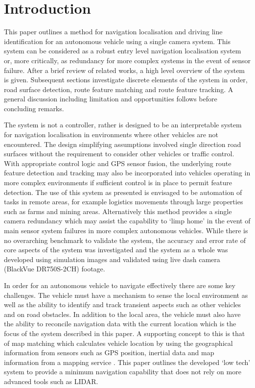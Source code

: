 \documentclass[]{aiaa-tc}%
\begin{document}

\newpage
\section{Introduction} \label{sect:intro}


This paper outlines a method for navigation localisation and driving line identification for an autonomous vehicle using a single camera system. This system can be considered as a robust entry level navigation localisation system or, more critically, as redundancy for more complex systems in the event of sensor failure. After a brief review of related works, a high level overview of the system is given. Subsequent sections investigate discrete elements of the system in order, road surface detection, route feature matching and route feature tracking. A general discussion including limitation and opportunities follows before concluding remarks.

The system is not a controller, rather is designed to be an interpretable system for navigation localisation in environments where other vehicles are not encountered. The design simplifying assumptions involved single direction road surfaces without the requirement to consider other vehicles or traffic control. With appropriate control logic and GPS sensor fusion, the underlying route feature detection and tracking may also be incorporated into vehicles operating in more complex environments if sufficient control is in place to permit feature detection. The use of this system as presented is envisaged to be automation of tasks in remote areas, for example logistics movements through large properties such as farms and mining areas. Alternatively this method provides a single camera redundancy which may assist the capability to `limp home' in the event of main sensor system failures in more complex autonomous vehicles. While there is no overarching benchmark to validate the system, the accuracy and error rate of core aspects of the system was investigated and the system as a whole was developed using simulation images and validated using live dash camera (BlackVue DR750S-2CH) footage.

In order for an autonomous vehicle to navigate effectively there are some key challenges. The vehicle must have a mechanism to sense the local environment as well as the ability to identify and track transient aspects such as other vehicles and on road obstacles. In addition to the local area, the vehicle must also have the ability to reconcile navigation data with the current location which is the focus of the system described in this paper. A supporting concept to this is that of map matching which calculates vehicle location by using the geographical information from sensors such as GPS position, inertial data and map information from a mapping service \citep{keyTechSelfDriving}. This paper outlines the developed `low tech' system to provide a minimum navigation capability that does not rely on more advanced tools such as LIDAR. 
\end{document}
